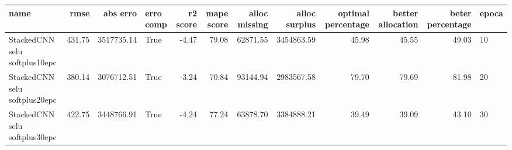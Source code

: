 \begin{tabular}{lrrlrrrrrrrl}
\toprule
name & rmse & abs erro & erro comp & r2 score & mape score & alloc missing & alloc surplus & optimal percentage & better allocation & beter percentage & epoca \\
\midrule
StackedCNN selu softplus10epc & 431.75 & 3517735.14 & True & -4.47 & 79.08 & 62871.55 & 3454863.59 & 45.98 & 45.55 & 49.03 & 10 \\
StackedCNN selu softplus20epc & 380.14 & 3076712.51 & True & -3.24 & 70.84 & 93144.94 & 2983567.58 & 79.70 & 79.69 & 81.98 & 20 \\
StackedCNN selu softplus30epc & 422.75 & 3448766.91 & True & -4.24 & 77.24 & 63878.70 & 3384888.21 & 39.49 & 39.09 & 43.10 & 30 \\
\bottomrule
\end{tabular}
